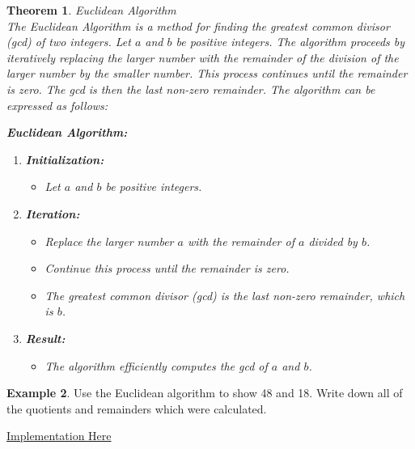 \documentclass[letterpaper,10pt]{article}
\theoremstyle{plain}
\newtheorem{thm}{Theorem}[section]
\theoremstyle{definition}
\newtheorem{exmp}[thm]{Example}
\theoremstyle{remark}
\begin{document}
\newpage
\begin{thm}{Euclidean Algorithm}$ $\\
The Euclidean Algorithm is a method for finding the greatest common divisor (gcd) of two integers. Let $a$ and $b$ be positive integers. The algorithm proceeds by iteratively replacing the larger number with the remainder of the division of the larger number by the smaller number. This process continues until the remainder is zero. The gcd is then the last non-zero remainder. The algorithm can be expressed as follows:

\textbf{Euclidean Algorithm:}

\begin{enumerate}
  \item \textbf{Initialization:}
    \begin{itemize}
      \item Let $a$ and $b$ be positive integers.
    \end{itemize}
  
  \item \textbf{Iteration:}
    \begin{itemize}
      \item Replace the larger number $a$ with the remainder of $a$ divided by $b$.
      \item Continue this process until the remainder is zero.
      \item The greatest common divisor (gcd) is the last non-zero remainder, which is $b$.
    \end{itemize}
  
  \item \textbf{Result:}
    \begin{itemize}
      \item The algorithm efficiently computes the gcd of $a$ and $b$.
    \end{itemize}
\end{enumerate}

\end{thm}
\begin{exmp}Use the Euclidean algorithm to show 48 and 
18. Write down all of the quotients and remainders which were calculated.
\vspace{3cm}
\end{exmp}
\href{https://pythontutor.com/render.html#code=def%20euclidean_algorithm%28a,%20b%29%3A%0A%20%20%20%20while%20b%20!%3D%200%3A%0A%20%20%20%20%20%20%20%20print%28f%22%7Ba%7D%3D%7Bb%7Dx%7Ba//b%7D%2B%7Ba%25b%7D%22%29%0A%20%20%20%20%20%20%20%20a,%20b%20%3D%20b,%20a%20%25%20b%0A%20%20%20%20return%20a%0A%0A%23%20Example%20usage%3A%0Anum1%20%3D%2048%0Anum2%20%3D%2018%0Aresult%20%3D%20euclidean_algorithm%28num1,%20num2%29%0A%0Aprint%28f%22The%20gcd%20of%20%7Bnum1%7D%20and%20%7Bnum2%7D%20is%3A%20%7Bresult%7D%22%29&cumulative=true&curInstr=18&heapPrimitives=nevernest&mode=display&origin=opt-frontend.js&py=3&rawInputLstJSON=%5B%5D&textReferences=false}{Implementation Here}
\end{document}
